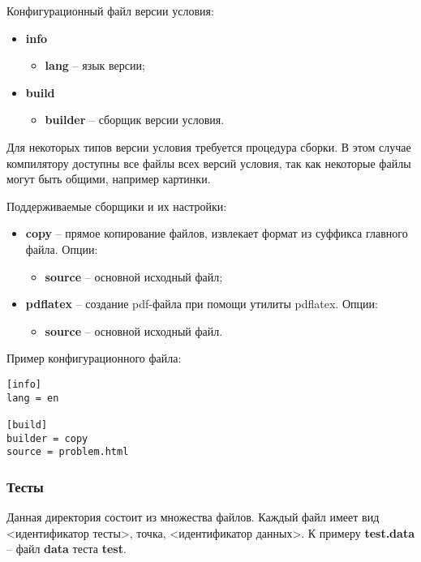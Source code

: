 Конфигурационный файл версии условия:
\begin{itemize}
    \item \textbf{info}
        \begin{itemize}
            \item \textbf{lang} -- язык версии;
        \end{itemize}
    \item \textbf{build}
        \begin{itemize}
            \item \textbf{builder} -- сборщик версии условия.
        \end{itemize}
\end{itemize}

Для некоторых типов версии условия требуется процедура сборки.
В этом случае компилятору доступны все файлы всех версий условия,
так как некоторые файлы могут быть общими, например картинки.

Поддерживаемые сборщики и их настройки:
\begin{itemize}
    \item \textbf{copy} -- прямое копирование файлов,
        извлекает формат из суффикса главного файла.
        Опции:
        \begin{itemize}
            \item \textbf{source} -- основной исходный файл;
        \end{itemize}
    \item \textbf{pdflatex} -- создание pdf-файла при помощи утилиты pdflatex.
        Опции:
        \begin{itemize}
            \item \textbf{source} -- основной исходный файл.
        \end{itemize}
\end{itemize}

Пример конфигурационного файла:
\begin{verbatim}
[info]
lang = en

[build]
builder = copy
source = problem.html
\end{verbatim}

\subsubsection{Тесты}
Данная директория состоит из множества файлов.
Каждый файл имеет вид <идентификатор тесты>, точка, <идентификатор данных>.
К примеру \textbf{test.data} -- файл \textbf{data} теста \textbf{test}.
